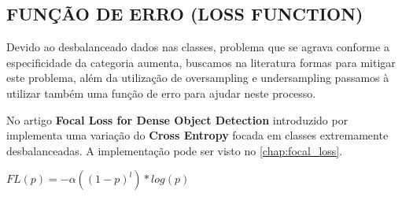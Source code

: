 \subsection{FUNÇÃO DE ERRO (LOSS FUNCTION)}

Devido ao desbalanceado dados nas classes, problema que se agrava conforme a especificidade da categoria aumenta, buscamos na literatura formas para mitigar este problema, além da utilização de oversampling e undersampling passamos à utilizar também uma função de erro para ajudar neste processo.

No artigo \textbf{Focal Loss for Dense Object Detection} introduzido por \cite{local_loss} implementa uma variação do \textbf{Cross Entropy} focada em classes extremamente desbalanceadas. A implementação pode ser visto no \autoref{chap:focal_loss}.

\begin{center}
    $FL(p) = -\alpha( (1 - p) ^ l) * log(p)$
\end{center}